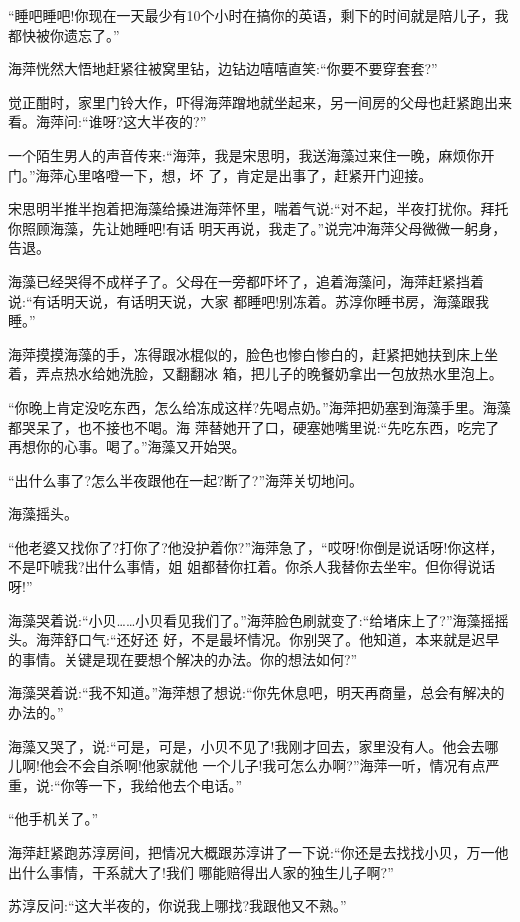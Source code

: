 \documentclass[11pt,a4paper,onecolumn]{article}
\begin{document}
``睡吧睡吧!你现在一天最少有10个小时在搞你的英语，剩下的时间就是陪儿子，我都快被你遗忘了。''

海萍恍然大悟地赶紧往被窝里钻，边钻边嘻嘻直笑:``你要不要穿套套?''

觉正酣时，家里门铃大作，吓得海萍蹭地就坐起来，另一间房的父母也赶紧跑出来看。海萍问:``谁呀?这大半夜的?''

一个陌生男人的声音传来:``海萍，我是宋思明，我送海藻过来住一晚，麻烦你开门。''海萍心里咯噔一下，想，坏
了，肯定是出事了，赶紧开门迎接。

宋思明半推半抱着把海藻给搡进海萍怀里，喘着气说:``对不起，半夜打扰你。拜托你照顾海藻，先让她睡吧!有话
明天再说，我走了。''说完冲海萍父母微微一躬身，告退。

海藻已经哭得不成样子了。父母在一旁都吓坏了，追着海藻问，海萍赶紧挡着说:``有话明天说，有话明天说，大家
都睡吧!别冻着。苏淳你睡书房，海藻跟我睡。''

海萍摸摸海藻的手，冻得跟冰棍似的，脸色也惨白惨白的，赶紧把她扶到床上坐着，弄点热水给她洗脸，又翻翻冰
箱，把儿子的晚餐奶拿出一包放热水里泡上。

``你晚上肯定没吃东西，怎么给冻成这样?先喝点奶。''海萍把奶塞到海藻手里。海藻都哭呆了，也不接也不喝。海
萍替她开了口，硬塞她嘴里说:``先吃东西，吃完了再想你的心事。喝了。''海藻又开始哭。

``出什么事了?怎么半夜跟他在一起?断了?''海萍关切地问。

海藻摇头。

``他老婆又找你了?打你了?他没护着你?''海萍急了，``哎呀!你倒是说话呀!你这样，不是吓唬我?出什么事情，姐
姐都替你扛着。你杀人我替你去坐牢。但你得说话呀!''

海藻哭着说:``小贝……小贝看见我们了。''海萍脸色刷就变了:``给堵床上了?''海藻摇摇头。海萍舒口气:``还好还
好，不是最坏情况。你别哭了。他知道，本来就是迟早的事情。关键是现在要想个解决的办法。你的想法如何?''

海藻哭着说:``我不知道。''海萍想了想说:``你先休息吧，明天再商量，总会有解决的办法的。''

海藻又哭了，说:``可是，可是，小贝不见了!我刚才回去，家里没有人。他会去哪儿啊!他会不会自杀啊!他家就他
一个儿子!我可怎么办啊?''海萍一听，情况有点严重，说:``你等一下，我给他去个电话。''

``他手机关了。''

海萍赶紧跑苏淳房间，把情况大概跟苏淳讲了一下说:``你还是去找找小贝，万一他出什么事情，干系就大了!我们
哪能赔得出人家的独生儿子啊?''

苏淳反问:``这大半夜的，你说我上哪找?我跟他又不熟。''
\end{document}
